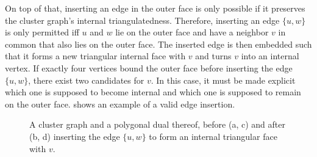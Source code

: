 On top of that, inserting an edge in the outer face is only possible if it preserves the cluster graph's internal triangulatedness.
Therefore, inserting an edge $\{u,w\}$ is only permitted iff $u$ and $w$ lie on the outer face and have a neighbor $v$ in common that also lies on the outer face.
The inserted edge is then embedded such that it forms a new triangular internal face with $v$ and turns $v$ into an internal vertex.
If exactly four vertices bound the outer face before inserting the edge $\{u,w\}$, there exist two candidates for $v$.
In this case, it must be made explicit which one is supposed to become internal and which one is supposed to remain on the outer face.
 shows an example of a valid edge insertion.

\begin{figure}[H]
	\centering
	\quad
	\qquad
	\quad
	\caption{A cluster graph and a polygonal dual thereof, before (a, c) and after (b, d) inserting the edge $\{u,w\}$ to form an internal triangular face with $v$.}
	\label{fig:flip-edge-example-insert}
\end{figure}

